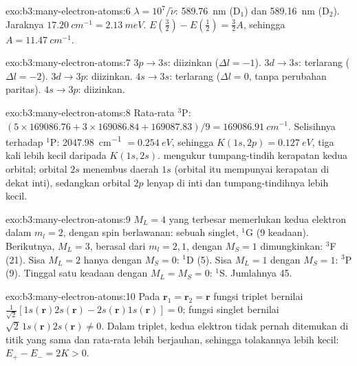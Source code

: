 \begin{solution}{exo:b3:many-electron-atoms:6}
$\lambda = 10^7/\tilde\nu$: \qty{589.76}{nm} (D$_1$) dan \qty{589.16}{nm}
(D$_2$). Jaraknya $\qty{17.20}{cm^{-1}} = \qty{2.13}{meV}$. $E(\frac32) -
E(\frac12) = \frac32A$, sehingga $A = \qty{11.47}{cm^{-1}}$.
\end{solution}

\begin{solution}{exo:b3:many-electron-atoms:7}
$3p \to 3s$: diizinkan ($\Delta l = -1$). $3d \to 3s$: terlarang ($\Delta l = -2$).
$3d \to 3p$: diizinkan. $4s \to 3s$: terlarang ($\Delta l = 0$, tanpa perubahan
paritas). $4s \to 3p$: diizinkan.
\end{solution}

\begin{solution}{exo:b3:many-electron-atoms:8}
Rata-rata ${}^3$P: $(5 \times 169086.76 + 3 \times 169086.84 + 169087.83)/9 =
\qty{169086.91}{cm^{-1}}$. Selisihnya terhadap ${}^1$P: \qty{2047.98}{cm^{-1}} $=
\qty{0.254}{eV}$, sehingga $K(1s,2p) = \qty{0.127}{eV}$, tiga kali lebih kecil
daripada $K(1s,2s)$.  mengukur tumpang-tindih kerapatan
kedua orbital; orbital $2s$ menembus daerah $1s$ (orbital itu mempunyai
kerapatan di dekat inti), sedangkan orbital $2p$ lenyap di inti dan
tumpang-tindihnya lebih kecil.
\end{solution}

\begin{solution}{exo:b3:many-electron-atoms:9}
$M_L = 4$ yang terbesar memerlukan kedua elektron dalam $m_l = 2$, dengan spin
berlawanan: sebuah singlet, ${}^1$G (9 keadaan). Berikutnya, $M_L = 3$, berasal
dari $m_l = 2, 1$, dengan $M_S = 1$ dimungkinkan: ${}^3$F (21). Sisa $M_L = 2$
hanya dengan $M_S = 0$: ${}^1$D (5). Sisa $M_L = 1$ dengan $M_S = 1$: ${}^3$P (9).
Tinggal satu keadaan dengan $M_L = M_S = 0$: ${}^1$S. Jumlahnya 45.
\end{solution}

\begin{solution}{exo:b3:many-electron-atoms:10}
Pada $\mathbf r_1 = \mathbf r_2 = \mathbf r$ fungsi triplet bernilai
$\frac{1}{\sqrt2}[1s(\mathbf r)2s(\mathbf r) - 2s(\mathbf r)1s(\mathbf r)] = 0$;
fungsi singlet bernilai $\sqrt2\,1s(\mathbf r)2s(\mathbf r) \ne 0$. Dalam
triplet, kedua elektron tidak pernah ditemukan di titik yang sama dan
rata-rata lebih berjauhan, sehingga tolakannya lebih kecil:
$E_+ - E_- = 2K > 0$.
\end{solution}

